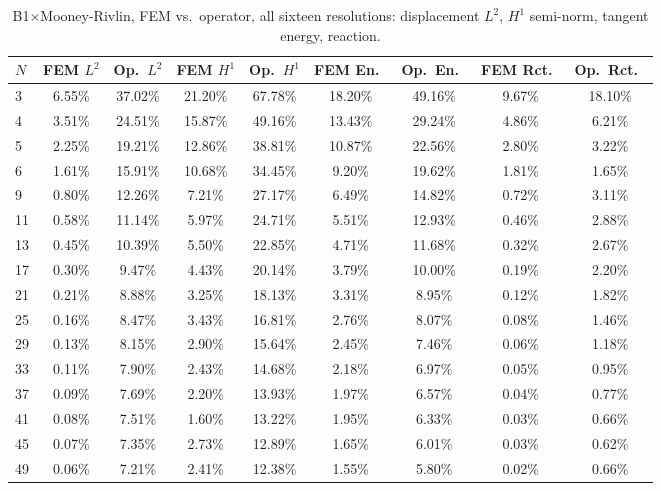 \documentclass[11pt]{article}
\begin{document}
\begin{table}[h]
\centering
\caption{B1$\times$Mooney-Rivlin, FEM vs.\ operator, all sixteen
  resolutions: displacement $L^2$, $H^1$ semi-norm, tangent energy,
  reaction.}
\label{tab:s2-b1mr-a}
\scriptsize
\begin{tabular}{lcccccccc}
\toprule
$N$ & FEM $L^2$ & Op.\ $L^2$ & FEM $H^1$ & Op.\ $H^1$ & FEM En.\ & Op.\ En.\ & FEM Rct.\ & Op.\ Rct.\ \\
\midrule
3  & 6.55\% & 37.02\% & 21.20\% & 67.78\% & 18.20\% & 49.16\% & 9.67\% & 18.10\% \\
4  & 3.51\% & 24.51\% & 15.87\% & 49.16\% & 13.43\% & 29.24\% & 4.86\% & 6.21\%  \\
5  & 2.25\% & 19.21\% & 12.86\% & 38.81\% & 10.87\% & 22.56\% & 2.80\% & 3.22\%  \\
6  & 1.61\% & 15.91\% & 10.68\% & 34.45\% & 9.20\%  & 19.62\% & 1.81\% & 1.65\%  \\
9  & 0.80\% & 12.26\% & 7.21\%  & 27.17\% & 6.49\%  & 14.82\% & 0.72\% & 3.11\%  \\
11 & 0.58\% & 11.14\% & 5.97\%  & 24.71\% & 5.51\%  & 12.93\% & 0.46\% & 2.88\%  \\
13 & 0.45\% & 10.39\% & 5.50\%  & 22.85\% & 4.71\%  & 11.68\% & 0.32\% & 2.67\%  \\
17 & 0.30\% & 9.47\%  & 4.43\%  & 20.14\% & 3.79\%  & 10.00\% & 0.19\% & 2.20\%  \\
21 & 0.21\% & 8.88\%  & 3.25\%  & 18.13\% & 3.31\%  & 8.95\%  & 0.12\% & 1.82\%  \\
25 & 0.16\% & 8.47\%  & 3.43\%  & 16.81\% & 2.76\%  & 8.07\%  & 0.08\% & 1.46\%  \\
29 & 0.13\% & 8.15\%  & 2.90\%  & 15.64\% & 2.45\%  & 7.46\%  & 0.06\% & 1.18\%  \\
33 & 0.11\% & 7.90\%  & 2.43\%  & 14.68\% & 2.18\%  & 6.97\%  & 0.05\% & 0.95\%  \\
37 & 0.09\% & 7.69\%  & 2.20\%  & 13.93\% & 1.97\%  & 6.57\%  & 0.04\% & 0.77\%  \\
41 & 0.08\% & 7.51\%  & 1.60\%  & 13.22\% & 1.95\%  & 6.33\%  & 0.03\% & 0.66\%  \\
45 & 0.07\% & 7.35\%  & 2.73\%  & 12.89\% & 1.65\%  & 6.01\%  & 0.03\% & 0.62\%  \\
49 & 0.06\% & 7.21\%  & 2.41\%  & 12.38\% & 1.55\%  & 5.80\%  & 0.02\% & 0.66\%  \\
\bottomrule
\end{tabular}
\end{table}
\end{document}
